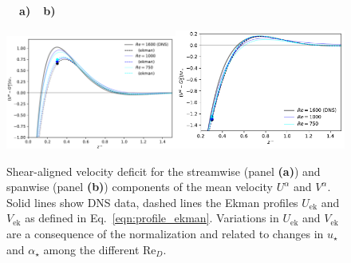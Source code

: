 \documentclass[smallcondensed,final]{svjour3}
\newcommand{\RE}{\mathrm{Re}}
\begin{document}
\begin{figure}
  \begin{flushleft}
    \textbf{\ \ a)}\hspace{0.45\textwidth}\textbf{\ \ b)}\\
  \end{flushleft} 
  \includegraphics[width=0.5\textwidth]{../plot/outer_layer_u.pdf}\includegraphics[width=0.5\textwidth]{../plot/outer_layer_w.pdf}
  \caption{
    \label{fig:profiles_outer}
    Shear-aligned velocity deficit for the streamwise (panel \textbf{(a)}) and spanwise (panel \textbf{(b)})
    components of the mean velocity $U^\alpha$ and $V^\alpha$.
    Solid lines show DNS data, dashed lines the Ekman profiles $U_\mathrm{ek}$ and $V_\mathrm{ek}$ as defined in
    Eq.~\ref{eqn:profile_ekman}. 
    Variations in $U_\mathrm{ek}$ and $V_\mathrm{ek}$ are
    a consequence of the normalization and related to changes in $u_\star$ and $\alpha_\star$ among the different $\RE_D$. 
  }
\end{figure}
\end{document}
